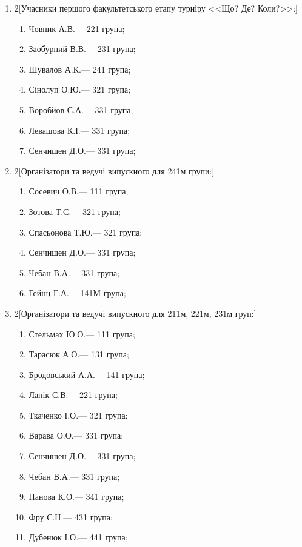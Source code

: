 \documentclass[
	a4paper,
	12pt,
	oneside,
	draft
]{extreport}
\begin{document}
\begin{enumerate}[topsep=0pt,itemsep=-1ex,partopsep=0ex,parsep=1ex]
\item 
\begin{multicols}{2}[Учасники першого факультетського етапу турніру <<Що? Де? Коли?>>:] 
\begin{enumerate}[topsep=0pt,itemsep=-1ex,partopsep=0ex,parsep=1ex,label=\arabic*.]
\item Човник А.В.\hfill --- 221 група;
\item Заобурний В.В.\hfill --- 231 група;
\item Шувалов А.К.\hfill --- 241 група;
\item Сінолуп О.Ю.\hfill --- 321 група;
\item Воробйов Є.А.\hfill --- 331 група;
\item Левашова К.І.\hfill --- 331 група;
\item Сенчишен Д.О.\hfill --- 331 група;
\end{enumerate}
\end{multicols}

\item 
\begin{multicols}{2}[Організатори та ведучі випускного для 241м групи:] 
\begin{enumerate}[topsep=0pt,itemsep=-1ex,partopsep=0ex,parsep=1ex,label=\arabic*.]
\item Сосевич О.В.\hfill --- 111 група;
\item Зотова Т.С.\hfill --- 321 група;
\item Спасьонова Т.Ю.\hfill --- 321 група;
\item Сенчишен Д.О.\hfill --- 331 група;
\item Чебан В.А.\hfill --- 331 група;
\item Гейнц Г.А.\hfill --- 141М група;
\end{enumerate}
\end{multicols}

\item 
\begin{multicols}{2}[Організатори та ведучі випускного для 211м, 221м, 231м груп:] 
\begin{enumerate}[topsep=0pt,itemsep=-1ex,partopsep=0ex,parsep=1ex,label=\arabic*.]
\item Стельмах Ю.О.\hfill --- 111 група;
\item Тарасюк А.О.\hfill --- 131 група;
\item Бродовський А.А.\hfill --- 141 група;
\item Лапік С.В.\hfill --- 221 група;
\item Ткаченко І.О.\hfill --- 321 група;
\item Варава О.О.\hfill --- 331 група;
\item Сенчишен Д.О.\hfill --- 331 група;
\item Чебан В.А.\hfill --- 331 група;
\item Панова К.О.\hfill --- 341 група;
\item Фру С.Н.\hfill --- 431 група;
\item Дубенюк І.О.\hfill --- 441 група;
\end{enumerate}
\end{multicols}


\end{enumerate}
\end{document}
